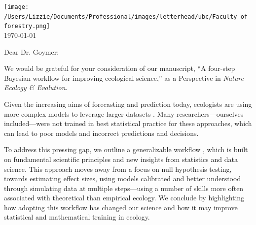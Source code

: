 \documentclass[11pt]{article}
\begin{document}

\renewcommand{\refname}{\CHead{}}

\hspace{-5ex} \texttt{[image: /Users/Lizzie/Documents/Professional/images/letterhead/ubc/Faculty of forestry.png]}
\vspace{1.5ex}\\

\setlength{\parindent}{0pt}
\setlength{\parskip}{7pt}
\today

Dear Dr. Goymer:

We would be grateful for your consideration of our manuscript, ``A four-step Bayesian workflow for improving ecological science,'' as a Perspective in \emph{Nature Ecology \& Evolution}. %

Given the increasing aims of forecasting and prediction today, ecologists are using more complex models to leverage larger datasets \citep{anderson2021trends,muff2022rewriting}. Many researchers---ourselves included---were not trained in best statistical practice for these approaches, which can lead to poor models and incorrect predictions and decisions. %

To address this pressing gap, we outline a generalizable workflow \citep{grinsztajn2021,vandeschoot2021}, which is built on fundamental scientific principles and new insights from statistics and data science. This approach  moves away from a focus on null hypothesis testing, towards estimating effect sizes, using models calibrated and better understood through simulating data at multiple steps---using a number of skills more often associated with theoretical than empirical ecology. We conclude by highlighting how adopting this workflow has changed our science and how it may improve statistical and mathematical training in ecology. 
\end{document}
